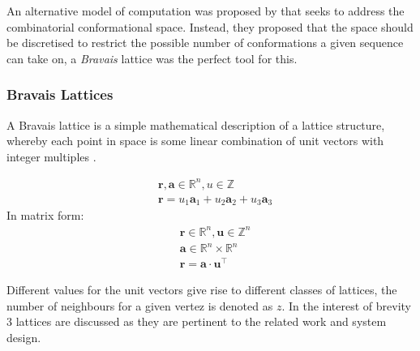 An alternative model of computation was proposed by \cite{Yue} that seeks to
address the combinatorial conformational space. Instead, they proposed
that the space should be discretised to restrict the possible number of conformations
a given sequence can take on, a \emph{Bravais} lattice was the perfect tool for this.
\subsubsection{Bravais Lattices}
A Bravais lattice is a simple mathematical description of a lattice structure, whereby
each point in space is some linear combination of unit vectors with integer multiples \cite{kittel}. 
\begin{center}
\begin{equation}
    \begin{split}
        & \mathbf{r}, \mathbf{a} \in \mathbb{R}^n, u \in \mathbb{Z} \\
        & \mathbf{r} = u_1\mathbf{a}_1 + u_2\mathbf{a}_2 + u_3\mathbf{a}_3 
    \end{split}
\end{equation}
    In matrix form:
\begin{equation}
    \begin{split}
        & \mathbf{r} \in \mathbb{R}^n, \mathbf{u} \in \mathbb{Z}^n \\
        & \mathbf{a} \in \mathbb{R}^n \times \mathbb{R}^n \\
        & \mathbf{r} = \mathbf{a} \cdot \mathbf{u}^\top
    \end{split}
\end{equation}
\end{center}
Different values for the unit vectors give rise to different classes of lattices, the number
of neighbours for a given vertez is denoted as $z$.
In the interest of brevity 3 lattices are discussed as they are pertinent 
to the related work and system design. \\
